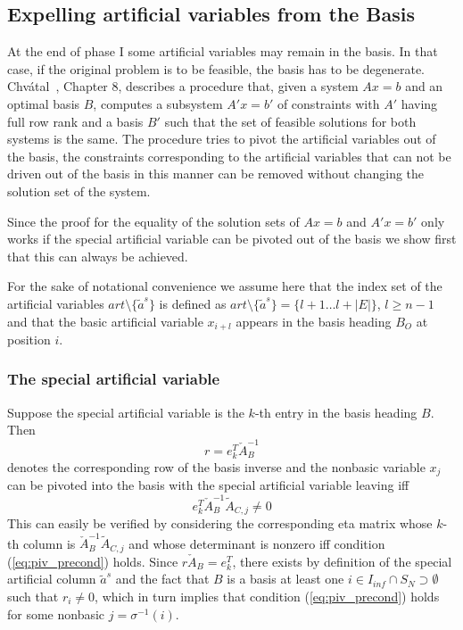 \documentclass[a4paper]{article}
\begin{document}
\subsection{Expelling artificial variables from the Basis}
At the end of phase I some artificial variables may remain in the basis.
In that case, if the original problem is to be feasible, the basis has to be
degenerate.
Chv\'{a}tal~\cite{Chvatal}, Chapter 8, describes a procedure that,
given a system $Ax = b$ and an optimal
basis $B$, computes a subsystem $A'x = b'$ of constraints with $A'$ having full
row rank and a basis $B'$ such that the set of feasible solutions for both
systems is the same. The procedure tries to pivot the artificial variables out of
the basis, the constraints corresponding to the artificial variables that can
not be driven out of the basis in this manner can be removed without changing
the solution set of the system.

Since the proof for the equality of the solution sets of $Ax = b$ and
$A'x = b'$ only works if the special artificial variable can be pivoted out of
the basis we show first that this can always be achieved.

For the sake of notational convenience we assume here that the index set of the
artificial variables $art\setminus \{\tilde{a}^{s}\}$ is defined as
$art\setminus \{\tilde{a}^{s}\}=\{l+1 \ldots l+\left|E\right| \}$,
$l \geq n-1$ and that the basic artificial variable $x_{i+l}$ appears in the
basis heading $B_{O}$ at position $i$. 
\subsubsection{The special artificial variable}
\label{sec:spec_art_unpert}
Suppose the special artificial variable is the $k$-th entry in the basis
heading $B$. Then 
\[ 
  r = e_{k}^{T} \check{A}_{B}^{-1}
\]
denotes the corresponding row of the basis inverse and
the nonbasic variable $x_{j}$ can be pivoted into the basis
with the special artificial variable leaving iff 
\begin{equation} \label{eq:piv_precond}
e_{k}^{T}\check{A}_{B}^{-1}\tilde{A}_{C,j} \neq 0
\end{equation}
This can easily be verified by considering the corresponding eta matrix
whose $k$-th column is $\check{A}_{B}^{-1}\tilde{A}_{C,j}$ and whose determinant
is nonzero iff condition (\ref{eq:piv_precond}) holds.
Since $r \check{A}_{B} = e_{k}^{T}$, there exists by definition of 
the special artificial column $\tilde{a}^{s}$ and the fact that $B$ is a basis
at least one
$i \in I_{inf} \cap S_{N} \supset \emptyset$ such that
$r_{i} \neq 0$, which in turn implies that condition
(\ref{eq:piv_precond}) holds for some nonbasic
$j = \sigma^{-1} \left( i \right)$.
\end{document}
